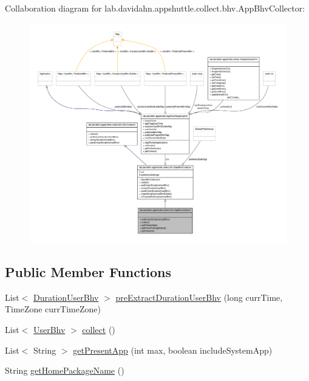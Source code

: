 \-Collaboration diagram for lab.\-davidahn.\-appshuttle.\-collect.\-bhv.\-App\-Bhv\-Collector\-:
\nopagebreak
\begin{figure}[H]
\begin{center}
\leavevmode
\includegraphics[width=350pt]{classlab_1_1davidahn_1_1appshuttle_1_1collect_1_1bhv_1_1_app_bhv_collector__coll__graph}
\end{center}
\end{figure}
\subsection*{\-Public \-Member \-Functions}
\begin{DoxyCompactItemize}
\item 
\-List$<$ \hyperlink{classlab_1_1davidahn_1_1appshuttle_1_1collect_1_1bhv_1_1_duration_user_bhv}{\-Duration\-User\-Bhv} $>$ \hyperlink{classlab_1_1davidahn_1_1appshuttle_1_1collect_1_1bhv_1_1_app_bhv_collector_ac455d99ad4599564c640158e466aa42e}{pre\-Extract\-Duration\-User\-Bhv} (long curr\-Time, \-Time\-Zone curr\-Time\-Zone)
\item 
\-List$<$ \hyperlink{interfacelab_1_1davidahn_1_1appshuttle_1_1collect_1_1bhv_1_1_user_bhv}{\-User\-Bhv} $>$ \hyperlink{classlab_1_1davidahn_1_1appshuttle_1_1collect_1_1bhv_1_1_app_bhv_collector_a9ef5881f1933eed96f54e5645965e44a}{collect} ()
\item 
\-List$<$ \-String $>$ \hyperlink{classlab_1_1davidahn_1_1appshuttle_1_1collect_1_1bhv_1_1_app_bhv_collector_a699262764a3efba1c0ae8b8527570fab}{get\-Present\-App} (int max, boolean include\-System\-App)
\item 
\-String \hyperlink{classlab_1_1davidahn_1_1appshuttle_1_1collect_1_1bhv_1_1_app_bhv_collector_a752d10c468c9ebc449492ab17dab1e90}{get\-Home\-Package\-Name} ()
\end{DoxyCompactItemize}
